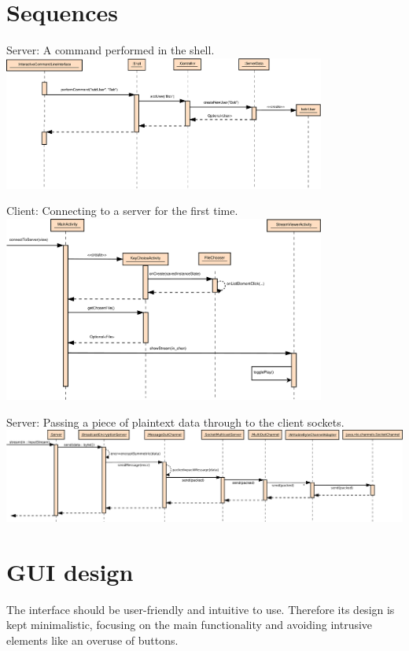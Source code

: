 \documentclass[a4paper,10pt]{scrartcl}
\begin{document}
\section{Sequences}
\begin{illustration}{Server: A command performed in the shell.}
\includegraphics [width=400px] {figures/sequence_diagram_server/Server1.pdf}
\end{illustration}
\begin{illustration}{Client: Connecting to a server for the first time.}
\includegraphics [width=400px] {figures/sequence_diagram_client/sequence_client.pdf}
\end{illustration}

\begin{landscape}
\begin{illustration}{Server: Passing a piece of plaintext data through to the client sockets.}
\includegraphics [width=700px] {figures/sequence_diagram_comm1_server/output.pdf}
\end{illustration}
\end{landscape}

\section{GUI design}
The interface should be user-friendly and intuitive to use. Therefore its design is kept minimalistic, focusing
on the main functionality and avoiding intrusive elements like an overuse of buttons.
\end{document}
